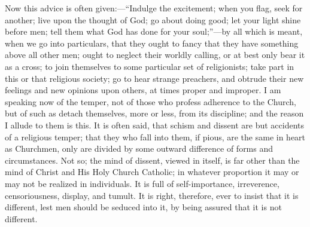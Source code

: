Now this advice is often given:—``Indulge the excitement;
when you flag, seek for another; live upon the thought of God; go
about doing good; let your light shine before men; tell them what God
has done for your soul;''—by all which is meant, when we go into
particulars, that they ought to fancy that they have something above
all other men; ought to neglect their worldly calling, or at best only
bear it as a cross; to join themselves to some particular set of
religionists; take part in this or that religious society; go to hear
strange preachers, and obtrude their new feelings and new opinions
upon others, at times proper and improper. I am speaking now of the
temper, not of those who profess adherence to the Church, but of such
as detach themselves, more or less, from its discipline; and the
reason I allude to them is this. It is often said, that schism and
dissent are but accidents of a religious temper; that they who fall
into them, if pious, are the same in heart as Churchmen, only are divided
by some outward difference of forms and circumstances. Not so; the
mind of dissent, viewed in itself, is far other than the mind of
Christ and His Holy Church Catholic; in whatever proportion it may or
may not be realized in individuals. It is full of self-importance,
irreverence, censoriousness, display, and tumult. It is right,
therefore, ever to insist that it is different, lest men should be
seduced into it, by being assured that it is not different.

